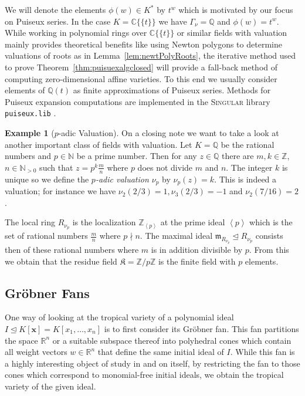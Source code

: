 \documentclass[
  paper=a4,
  titlepage,
  bibliography=totoc,
  pagesize=pdftex
]{scrartcl}
\numberwithin{figure}{section}
\numberwithin{equation}{section}
\numberwithin{table}{section}
\newcommand*\setZ{\mathds{Z}}
\newcommand*\setR{\mathds{R}}
\newcommand*\setC{\mathds{C}}
\newcommand*\setQ{\mathds{Q}}
\newcommand*\setN{\mathds{N}}
\newcommand*\ideal[1]{\left\langle #1 \right\rangle}
\newcommand*\puiseux[2]{#1\{\!\{#2\}\!\}}
\newcommand*\CCt{\puiseux{\setC}{t}}
\let\vec\mathbf
\let\idealof\trianglelefteq
\theoremstyle{definition}
\newtheorem{example}[definition]{Example}
\numberwithin{definition}{section}
\begin{document}
We will denote the elements $\phi(w) \in K^*$ by $t^w$ which is motivated by our focus on
Puiseux series. In the case $K = \CCt$ we have $\Gamma_\nu = \setQ$ and $\phi(w) = t^w$.
While working in polynomial rings over $\CCt$ or similar fields with valuation mainly
provides theoretical benefits like using Newton polygons to determine valuations of roots
as in Lemma~\ref{lem:newtPolyRoots}, the iterative method used to prove
Theorem~\ref{thm:puisuexalgclosed} will provide a fall-back method of computing
zero-dimensional affine varieties. To this end we usually consider elements of $\setQ(t)$
as finite approximations of Puiseux series. Methods for Puiseux expansion computations are
implemented in the \textsc{Singular} library \texttt{puiseux.lib} \cite{puiseuxLib}.

\begin{example}[$p$-adic Valuation] \label{ex:pAdic}
  On a closing note we want to take a look at another important class of fields with
  valuation. Let $K = \setQ$ be the rational numbers and $p\in \setN$ be a prime number.
  Then for any $z \in \setQ$ there are $m, k \in \setZ$, $n \in \setN_{>0}$ such that $z =
  p^k \frac mn$ where $p$ does not divide $m$ and $n$. The integer $k$ is unique so we
  define the \emph{$p$-adic valuation $\nu_p$} by $\nu_p(z) = k$. This is indeed a
  valuation; for instance we have $\nu_2(2/3) = 1, \nu_3(2/3)=-1$ and $\nu_2(7/16)=2$.

  The local ring $R_{\nu_p}$ is the localization $\setZ_{\ideal p}$ at the prime ideal
  $\ideal p$ which is the set of rational numbers $\frac mn$ where $p \nmid n$. The
  maximal ideal $\mathfrak m_{R_{\nu_p}} \idealof R_{\nu_p}$ consists then of these
  rational numbers where $m$ is in addition divisible by $p$. From this we obtain that
  the residue field $\mathfrak K = \setZ/p\setZ$ is the finite field with $p$ elements.
\end{example}

\subsection{Gröbner Fans}
\label{sec:grobFan}

One way of looking at the tropical variety of a polynomial ideal $I \idealof K[\vec x] =
K[x_1, \dots, x_n]$ is to first consider its Gröbner fan. This fan partitions the space
$\setR^n$ or a suitable subspace thereof into polyhedral cones which contain all weight
vectors $w\in \setR^n$ that define the same initial ideal of $I$. While this fan is a
highly interesting object of study in and on itself, by restricting the fan to those cones
which correspond to monomial-free initial ideals, we obtain the tropical variety of the
given ideal.
\end{document}
